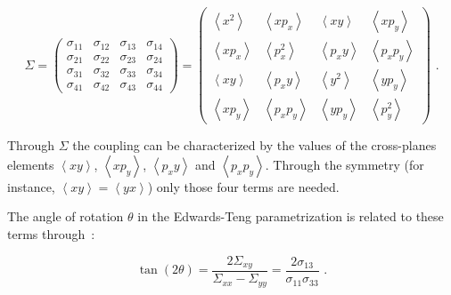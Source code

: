 \begin{equation}
    \Sigma = \begin{pmatrix} 
        \sigma_{11} & \sigma_{12} & \sigma_{13} & \sigma_{14} \\
        \sigma_{21} & \sigma_{22} & \sigma_{23} & \sigma_{24} \\
        \sigma_{31} & \sigma_{32} & \sigma_{33} & \sigma_{34} \\
        \sigma_{41} & \sigma_{42} & \sigma_{43} & \sigma_{44}
    \end{pmatrix} = \begin{pmatrix}
        \left\langle x^2 \right\rangle           &  \left\langle x p_x \right\rangle           &  \left\langle x y \right\rangle           &  \left\langle x p_y \right\rangle           \\
        \left\langle x p_x \right\rangle  &  \left\langle p_x^2 \right\rangle         &  \left\langle p_x y \right\rangle  &  \left\langle p_x p_y \right\rangle  \\
        \left\langle x y \right\rangle           &  \left\langle p_x y \right\rangle           &  \left\langle y^2 \right\rangle           &  \left\langle y p_y \right\rangle           \\
        \left\langle x p_y \right\rangle  &  \left\langle p_x p_y \right\rangle  &  \left\langle y p_y \right\rangle  &  \left\langle p_y^2 \right\rangle
    \end{pmatrix} \text{ .}
    \label{equation:4d_sigma_matrix}
\end{equation}
\vspace{1pt}

Through \(\Sigma\) the coupling can be characterized by the values of the cross-planes elements \(\left\langle x y \right\rangle\), \(\left\langle x p_y \right\rangle\), \(\left\langle p_x y \right\rangle\) and \(\left\langle p_x p_y \right\rangle\).
Through the symmetry (for instance, \(\left\langle x y \right\rangle = \left\langle y x \right\rangle\)) only those four terms are needed.

The angle of rotation \(\theta\) in the Edwards-Teng parametrization is related to these terms through~\cite{EPAC:Cai:Luminosity_of_Asymmetric_e+e-_Collider_with_Coupling_Lattices}:

\begin{equation}
    \tan \left( 2 \theta \right) = \frac{2 \Sigma_{xy}}{\Sigma_{xx} - \Sigma_{yy}} = \frac{2 \sigma_{13}}{\sigma_{11} \sigma_{33}} \text{ .}
    \label{equation:edwards_teng_theta_to_sigma_matrix_terms}
\end{equation}

